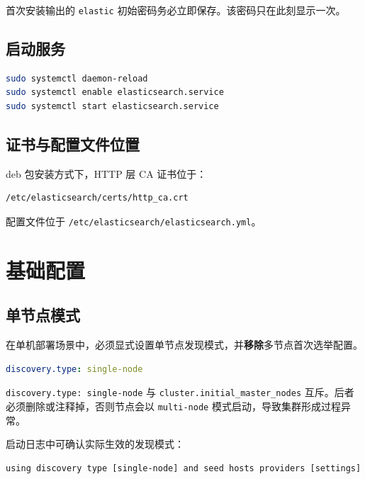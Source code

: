 \documentclass[11pt,a4paper,openany]{ctexbook}
\begin{document}
\begin{warn}
首次安装输出的 \texttt{elastic} 初始密码务必立即保存。该密码只在此刻显示一次。
\end{warn}

\section{启动服务}

\begin{lstlisting}[language=bash]
sudo systemctl daemon-reload
sudo systemctl enable elasticsearch.service
sudo systemctl start elasticsearch.service
\end{lstlisting}

\section{证书与配置文件位置}

deb 包安装方式下，HTTP 层 CA 证书位于：

\begin{lstlisting}
/etc/elasticsearch/certs/http_ca.crt
\end{lstlisting}

配置文件位于 \texttt{/etc/elasticsearch/elasticsearch.yml}。

\chapter{基础配置}

\section{单节点模式}

在单机部署场景中，必须显式设置单节点发现模式，并\textbf{移除}多节点首次选举配置。

\begin{lstlisting}[language=yaml]
discovery.type: single-node
\end{lstlisting}

\begin{warn}
\texttt{discovery.type: single-node} 与 \texttt{cluster.initial\_master\_nodes} 互斥。后者必须删除或注释掉，否则节点会以 \texttt{multi-node} 模式启动，导致集群形成过程异常。
\end{warn}

启动日志中可确认实际生效的发现模式：

\begin{lstlisting}
using discovery type [single-node] and seed hosts providers [settings]
\end{lstlisting}
\end{document}
